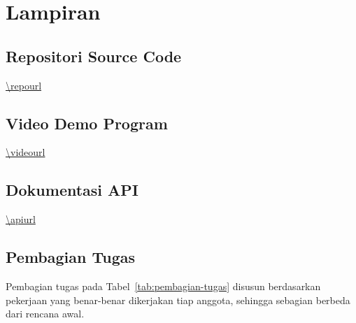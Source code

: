 \appendix
\section{Lampiran}

\subsection{Repositori Source Code}
\url{\repourl}

\subsection{Video Demo Program}
\url{\videourl}

\subsection{Dokumentasi API}
\url{\apiurl}

\subsection{Pembagian Tugas}
Pembagian tugas pada Tabel~\ref{tab:pembagian-tugas} disusun berdasarkan pekerjaan yang benar-benar
dikerjakan tiap anggota, sehingga sebagian berbeda dari rencana awal.

